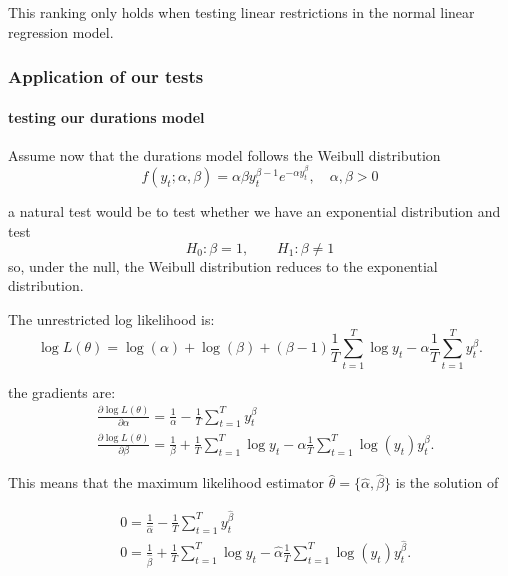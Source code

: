 \documentclass[11pt]{article}
\begin{document}
\begin{note}
    This ranking only holds when testing linear restrictions in the normal linear regression model.
\end{note}

\subsubsection{Application of our tests}

\paragraph{testing our durations model} \mbox{}

Assume now that the durations model follows the Weibull distribution
\begin{equation}
f\left(y_t ; \alpha, \beta\right)=\alpha \beta y_t^{\beta-1} e^{-\alpha y_t^\beta}, \quad \alpha, \beta>0
\end{equation}

a natural test would be to test whether we have an exponential distribution and test
\[H_0: \beta=1, \qquad H_1: \beta\neq1\]
so, under the null, the Weibull distribution reduces to the exponential distribution.

The unrestricted log likelihood is:
\begin{equation}
\log L(\theta)=\log (\alpha)+\log (\beta)+(\beta-1) \frac{1}{T} \sum_{t=1}^T \log y_t-\alpha \frac{1}{T} \sum_{t=1}^T y_t^\beta .
\end{equation}

the gradients are:
\begin{equation}
\begin{aligned}
& \frac{\partial \log L(\theta)}{\partial \alpha}=\frac{1}{\alpha}-\frac{1}{T} \sum_{t=1}^T y_t^\beta \\
& \frac{\partial \log L(\theta)}{\partial \beta}=\frac{1}{\beta}+\frac{1}{T} \sum_{t=1}^T \log y_t-\alpha \frac{1}{T} \sum_{t=1}^T \log \left(y_t\right) y_t^\beta .
\end{aligned}
\end{equation}

This means that the maximum likelihood estimator $\hat{\theta} = \{\hat{\alpha}, \hat{\beta}\}$ is the solution of

\begin{equation}
\begin{aligned}
& 0=\frac{1}{\widehat{\alpha}}-\frac{1}{T} \sum_{t=1}^T y_t^{\widehat{\beta}} \\
& 0=\frac{1}{\widehat{\beta}}+\frac{1}{T} \sum_{t=1}^T \log y_t-\widehat{\alpha} \frac{1}{T} \sum_{t=1}^T \log \left(y_t\right) y_t^{\widehat{\beta}} .
\end{aligned}
\end{equation}
\end{document}
